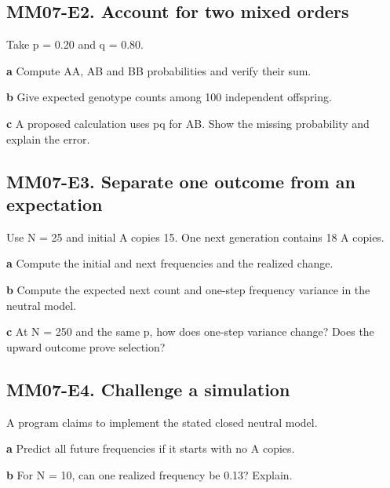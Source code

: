 \documentclass[11pt,letterpaper]{article}
\theoremstyle{definition}\newtheorem{definition}{Definition}\newtheorem{example}{Example}
\numberwithin{equation}{section}
\begin{document}
\par\noindent\begin{minipage}{\linewidth}
\subsection*{MM07-E2. Account for two mixed orders}
Take p =\allowbreak{} 0.20 and q =\allowbreak{} 0.80.

\textbf{a} Compute AA, AB and BB probabilities and verify their sum.

\end{minipage}\par\medskip
\textbf{b} Give expected genotype counts among 100 independent offspring.

\textbf{c} A proposed calculation uses pq for AB. Show the missing probability and explain the error.

\par\noindent\begin{minipage}{\linewidth}
\subsection*{MM07-E3. Separate one outcome from an expectation}
Use N =\allowbreak{} 25 and initial A copies 15. One next generation contains 18 A copies.

\textbf{a} Compute the initial and next frequencies and the realized change.

\end{minipage}\par\medskip
\textbf{b} Compute the expected next count and one-step frequency variance in the neutral model.

\textbf{c} At N =\allowbreak{} 250 and the same p, how does one-step variance change? Does the upward outcome prove selection?

\par\noindent\begin{minipage}{\linewidth}
\subsection*{MM07-E4. Challenge a simulation}
A program claims to implement the stated closed neutral model.

\textbf{a} Predict all future frequencies if it starts with no A copies.

\end{minipage}\par\medskip
\textbf{b} For N =\allowbreak{} 10, can one realized frequency be 0.13? Explain.
\end{document}
